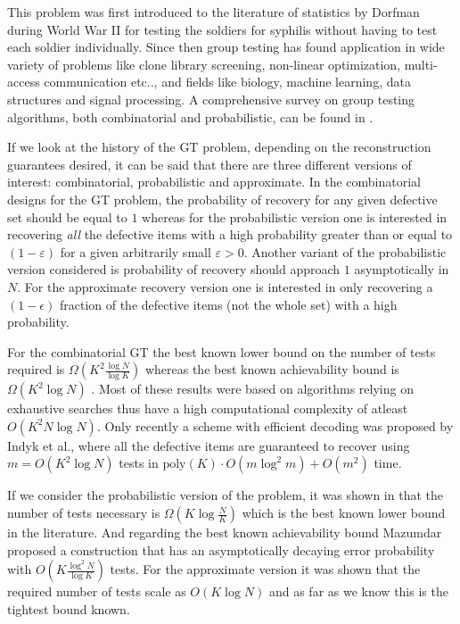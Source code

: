 \documentclass[conference,,twocolumn]{IEEEtran}
\begin{document}
This problem was first introduced to the literature of statistics by Dorfman \cite{dorfman1943detection} during World War II for testing the soldiers for syphilis without having to test each soldier individually. Since then group testing has found application in wide variety of problems like clone library screening, non-linear optimization, multi-access communication etc.., \cite{du1999combinatorial} and fields like biology\cite{chen2008survey}, machine learning\cite{malioutov2013exact}, data structures\cite{goodrich2005indexing} and signal processing\cite{emad2014poisson}. A comprehensive survey on group testing algorithms, both combinatorial and probabilistic, can be found in \cite{du1999combinatorial,chan2014non,atia2012boolean}. 

If we look at the history of the GT problem, depending on the reconstruction guarantees desired, it can be said that there are three different versions of interest: combinatorial, probabilistic and approximate. In the combinatorial designs for the GT problem, the probability of recovery for any given defective set should be equal to $1$ whereas for the probabilistic version one is interested in recovering \textit{all} the defective items with a high probability greater than or equal to $(1-\varepsilon)$ for a given arbitrarily small $\varepsilon>0$. Another variant of the probabilistic version considered is probability of recovery should approach $1$ asymptotically in $N$. For the approximate recovery version one is interested in only recovering a $(1-\epsilon)$ fraction of the defective items (not the whole set) with a high probability.

For the combinatorial GT the best known lower bound on the number of tests required is $\Omega(K^2\frac{\log N}{\log K})$ \cite{d1982bounds,erdos1985families} whereas the best known achievability bound is $\Omega(K^2 \log N)$ \cite{kautz1964nonrandom,porat2011explicit}. Most of these results were based on algorithms relying on exhaustive searches thus have a high computational complexity of atleast $O(K^2 N\log N)$. Only recently a scheme with efficient decoding was proposed by Indyk et al., \cite{indyk2010efficiently} where all the defective items are guaranteed to recover using $m=O(K^2\log N)$ tests in $\text{poly}(K)\cdot O(m \log^2 m )+O(m^2)$ time. 

If we consider the probabilistic version of the problem, it was shown in \cite{chan2014non,atia2012boolean} that the number of tests
necessary is $\Omega(K\log \frac{N}{K})$ which is the best known lower bound in the literature. And regarding the best known achievability bound Mazumdar \cite{mazumdar2015nonadaptive} proposed a construction that has an asymptotically decaying error probability with $O(K\frac{\log^2 N}{\log K})$ tests. For the approximate version it was shown \cite{atia2012boolean} that the required number of tests scale as $O(K\log N)$ and as far as we know this is the tightest bound known.
\end{document}
